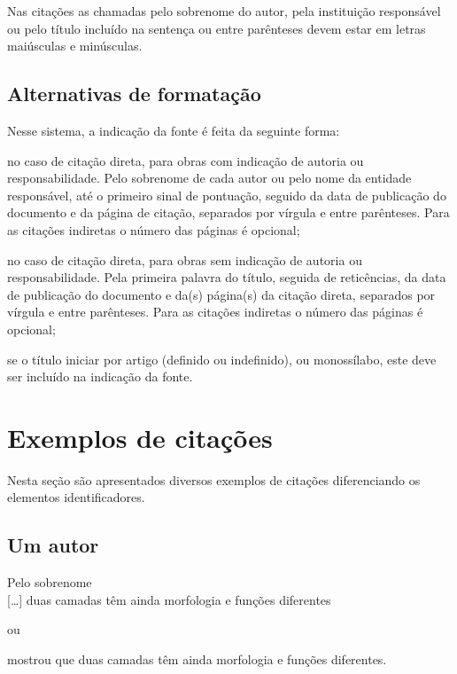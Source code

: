 Nas citações as chamadas pelo sobrenome do autor, pela instituição responsável ou pelo título incluído na sentença ou entre parênteses devem estar em letras maiúsculas e minúsculas.

\subsection{Alternativas de formatação}
Nesse sistema, a indicação da fonte é feita da seguinte forma:

\begin{alineas}
	\item
	no caso de citação direta, para obras com indicação de autoria ou responsabilidade. Pelo sobrenome de cada autor ou pelo nome da entidade responsável, até o primeiro sinal de pontuação, seguido da data de publicação do documento e da página de citação, separados por vírgula e entre parênteses. Para as citações indiretas o número das páginas é opcional;
	\item
	no caso de citação direta, para obras sem indicação de autoria ou responsabilidade. Pela primeira palavra do título, seguida de reticências, da data de publicação do documento e da(s) página(s) da citação direta, separados por vírgula e entre parênteses. Para as citações indiretas o número das páginas é opcional;
	\item
	se o título iniciar por artigo (definido ou indefinido), ou monossílabo, este deve ser incluído na indicação da fonte.
	
\end{alineas}
	
\section{Exemplos de citações}

Nesta seção são apresentados diversos exemplos de citações diferenciando os elementos identificadores. 

\subsection{Um autor}

Pelo sobrenome\\

[\ldots] duas camadas têm ainda morfologia e funções diferentes \cite{Pereira2013}

ou

 mostrou que duas camadas têm ainda morfologia e funções diferentes.\\


